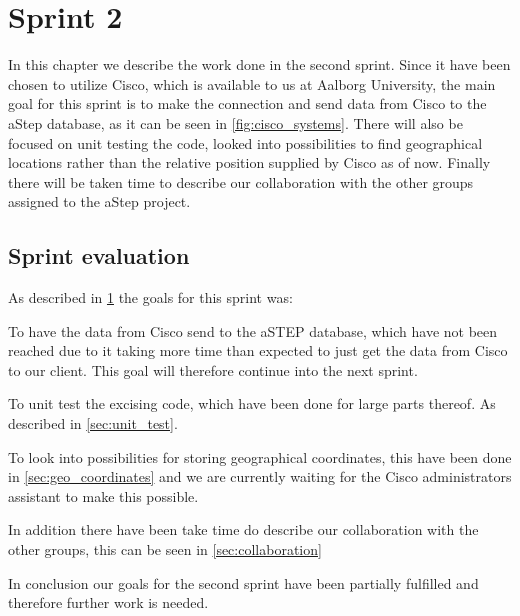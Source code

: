 \chapter{Sprint 2}\label{cha:sprint2}
In this chapter we describe the work done in the second sprint. Since it have been chosen to utilize Cisco, which is available to us at Aalborg University, the main goal for this sprint is to make the connection and send data from Cisco to the aStep database, as it can be seen in \cref{fig:cisco_systems}. There will also be focused on unit testing the code, looked into possibilities to find geographical locations rather than the relative position supplied by Cisco as of now. Finally there will be taken time to describe our collaboration with the other groups assigned to the aStep project.







\section{Sprint evaluation}
As described in \cref{cha:sprint2} the goals for this sprint was: 
\begin{\itemize}
	\item To have the data from Cisco send to the aSTEP database, which have not been reached due to it taking more time than expected to just get the data from Cisco to our client. This goal will therefore continue into the next sprint.
	\item To unit test the excising code, which have been done for large parts thereof. As described in \cref{sec:unit_test}.
	\item To look into possibilities for storing geographical coordinates, this have been done in \cref{sec:geo_coordinates} and we are currently waiting for the Cisco administrators assistant to make this possible.
	\item In addition there have been take time do describe our collaboration with the other groups, this can be seen in \cref{sec:collaboration} 
\end{\itemize}
In conclusion our goals for the second sprint have been partially fulfilled and therefore further work is needed.